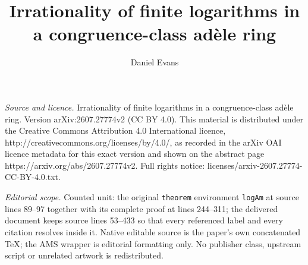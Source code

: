 \documentclass[10pt,a4paper]{amsart}
\begin{document}
\title[Irrationality of finite logarithms in a congruence-class ad`]{Irrationality of finite logarithms in a congruence-class ad\`ele ring}
\author{Daniel Evans}
\date{}
\maketitle
\noindent\emph{Source and licence.} Irrationality of finite logarithms in a congruence-class ad\`ele ring. Version arXiv:2607.27774v2 (CC BY 4.0). This material is distributed under the Creative Commons Attribution 4.0 International licence, http://creativecommons.org/licenses/by/4.0/, as recorded in the arXiv OAI licence metadata for this exact version and shown on the abstract page https://arxiv.org/abs/2607.27774v2. Full rights notice: licenses/arxiv-2607.27774-CC-BY-4.0.txt.\par\smallskip
\noindent\textit{Editorial scope.} Counted unit: the original \texttt{theorem} environment \texttt{logAm} at source lines 89--97 together with its complete proof at lines 244--311; the delivered document keeps source lines 53--433 so that every referenced label and every citation resolves inside it. Native editable source is the paper's own concatenated TeX; the AMS wrapper is editorial formatting only. No publisher class, upstream script or unrelated artwork is redistributed.
\end{document}
